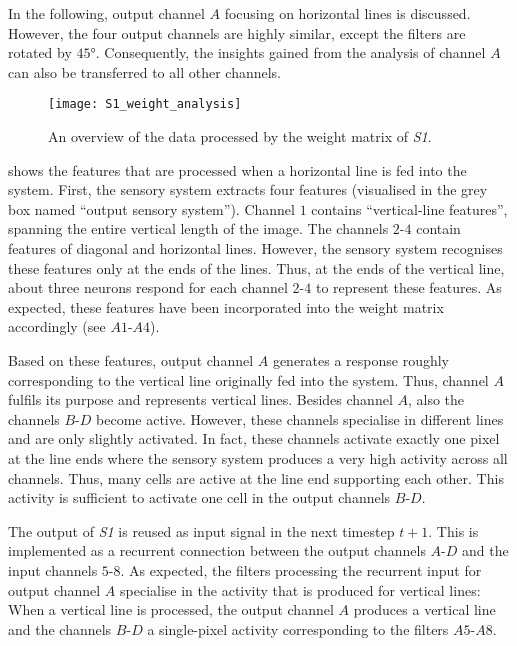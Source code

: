 In the following, output channel $A$ focusing on horizontal lines is discussed.
However, the four output channels are highly similar, except the filters are rotated by $45°$.
Consequently, the insights gained from the analysis of channel $A$ can also be transferred to all other channels.

\begin{figure}[h]
    \centering
    \texttt{[image: S1\_weight\_analysis]}
    \caption[Analysis of weight matrix]{An overview of the data processed by the weight matrix of \emph{S1}.}
\end{figure}
%
 shows the features that are processed when a horizontal line is fed into the system.
First, the sensory system extracts four features (visualised in the grey box named ``output sensory system'').
Channel $1$ contains ``vertical-line features'', spanning the entire vertical length of the image. 
The channels $2$-$4$ contain features of diagonal and horizontal lines. However, the sensory system recognises these features only at the ends of the lines.
Thus, at the ends of the vertical line, about three neurons respond for each channel $2$-$4$ to represent these features.
As expected, these features have been incorporated into the weight matrix accordingly (see $A1$-$A4$).

Based on these features, output channel $A$ generates a response roughly corresponding to the vertical line originally fed into the system.
Thus, channel $A$ fulfils its purpose and represents vertical lines.
Besides channel $A$, also the channels $B$-$D$ become active.
However, these channels specialise in different lines and are only slightly activated.
In fact, these channels activate exactly one pixel at the line ends where the sensory system produces a very high activity across all channels.
Thus, many cells are active at the line end supporting each other.
This activity is sufficient to activate one cell in the output channels $B$-$D$.

The output of \emph{S1} is reused as input signal in the next timestep $t+1$.
This is implemented as a recurrent connection between the output channels $A$-$D$ and the input channels $5$-$8$.
As expected, the filters processing the recurrent input for output channel $A$ specialise in the activity that is produced for vertical lines:
When a vertical line is processed, the output channel $A$ produces a vertical line and the channels $B$-$D$ a single-pixel activity corresponding to the filters $A5$-$A8$.


